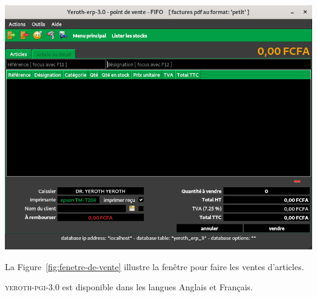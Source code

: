 \documentclass[a4paper, 10pt]{article}
\newcommand{\yeroth}{\textsc{yeroth-pgi-3.0}\xspace}
\begin{document}
\begin{multicols}{2}
\begin{center}
\includegraphics[scale=0.33]{../images/yeren-fenetre-caissier.png}
\label{fig:fenetre-de-vente}
\end{center}


La Figure~\ref{fig:fenetre-de-vente} illustre la
fen\^etre pour faire les ventes d'articles.

\yeroth est disponible dans les langues Anglais et Fran\c{c}ais. 

\end{multicols}
\end{document}
